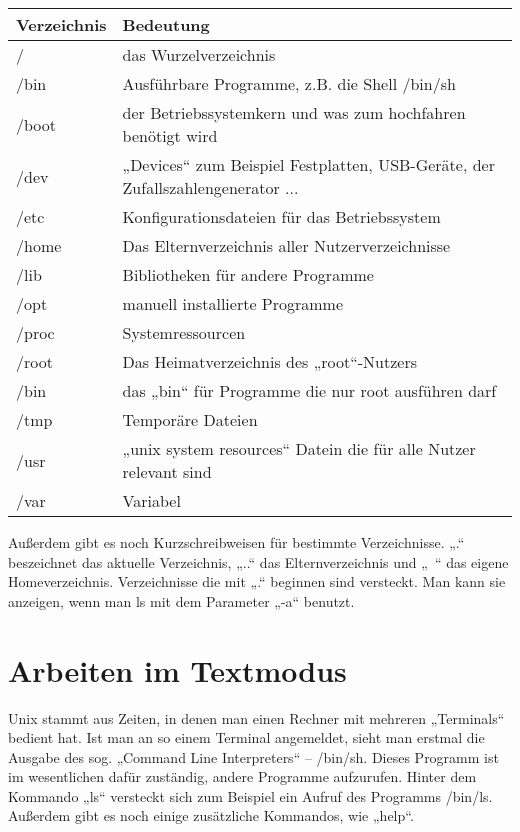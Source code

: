 \begin{table}
\centering
\begin{tabular}{l|l}
Verzeichnis & Bedeutung \\ \hline
/ & das Wurzelverzeichnis \\
/bin & Ausführbare Programme, z.B. die Shell /bin/sh \\
/boot & der Betriebssystemkern und was zum hochfahren benötigt wird \\
/dev & „Devices“ zum Beispiel Festplatten, USB-Geräte, der Zufallszahlengenerator ...\\
/etc & Konfigurationsdateien für das Betriebssystem \\
/home & Das Elternverzeichnis aller Nutzerverzeichnisse \\
/lib & Bibliotheken für andere Programme \\
/opt & manuell installierte Programme \\
/proc & Systemressourcen \\
/root & Das Heimatverzeichnis des „root“-Nutzers \\
/bin & das „bin“ für Programme die nur root ausführen darf \\
/tmp & Temporäre Dateien \\
/usr & „unix system resources“ Datein die für alle Nutzer relevant sind \\
/var & Variabel
\end{tabular}
\label{UNIX-Verzeichnisse}
\end{table}

Außerdem gibt es noch Kurzschreibweisen für bestimmte Verzeichnisse. „.“ beszeichnet das aktuelle Verzeichnis, „..“ das Elternverzeichnis und „~“ das eigene Homeverzeichnis.
Verzeichnisse die mit „.“ beginnen sind versteckt. Man kann sie anzeigen, wenn man ls mit dem Parameter „-a“ benutzt.

\section{Arbeiten im Textmodus}
Unix stammt aus Zeiten, in denen man einen Rechner mit mehreren „Terminals“ bedient hat. 
Ist man an so einem Terminal angemeldet, sieht man erstmal die Ausgabe des sog. „Command Line Interpreters“ – /bin/sh.
Dieses Programm ist im wesentlichen dafür zuständig, andere Programme aufzurufen. Hinter dem Kommando „ls“ versteckt sich zum Beispiel ein Aufruf des Programms /bin/ls. Außerdem gibt es noch einige zusätzliche Kommandos, wie „help“. 


